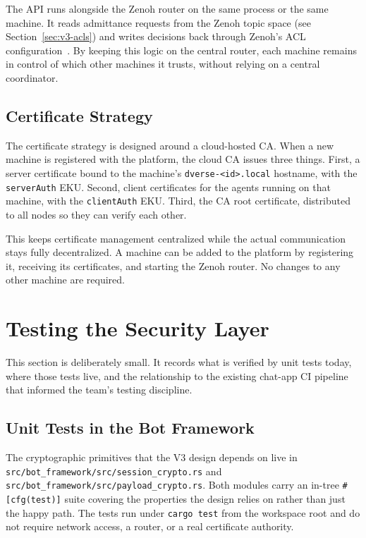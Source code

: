 \documentclass[11pt,a4paper]{article}
\begin{document}
The API runs alongside the Zenoh router on the same process or the
same machine. It reads admittance requests from the Zenoh topic space
(see Section~\ref{sec:v3-acls}) and writes decisions back through
Zenoh's ACL configuration~\citep{zenoh-acl,zenoh-acl-rfc}. By keeping
this logic on the central router, each machine remains in control of
which other machines it trusts, without relying on a central coordinator.

\subsection{Certificate Strategy}

The certificate strategy is designed around a cloud-hosted CA. When a
new machine is registered with the platform, the cloud CA issues
three things. First, a server certificate bound to the machine's
\texttt{dverse-<id>.local} hostname, with the \texttt{serverAuth}
EKU. Second, client certificates for the agents running on that
machine, with the \texttt{clientAuth} EKU. Third, the CA root
certificate, distributed to all nodes so they can verify each other.

This keeps certificate management centralized while the actual
communication stays fully decentralized. A machine can be added to
the platform by registering it, receiving its certificates, and
starting the Zenoh router. No changes to any other machine are required.

\section{Testing the Security Layer}
\label{sec:testing}

This section is deliberately small. It records what is verified
by unit tests today, where those tests live, and the
relationship to the existing chat-app CI pipeline that informed
the team's testing discipline.

\subsection{Unit Tests in the Bot Framework}

The cryptographic primitives that the V3 design depends on live
in \texttt{src/bot\_framework/src/session\_crypto.rs} and
\texttt{src/bot\_framework/src/payload\_crypto.rs}. Both modules
carry an in-tree \texttt{\#[cfg(test)]} suite covering the
properties the design relies on rather than just the happy path.
The tests run under \texttt{cargo test} from the workspace root
and do not require network access, a router, or a real
certificate authority.
\end{document}

